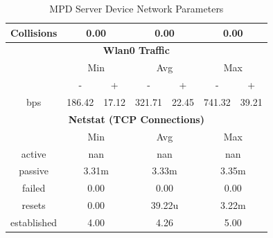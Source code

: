 \documentclass[11pt,a4paper]{scrreprt}
\begin{document}
\begin{table}[H]
\begin{tabular}{||c|c|c|c|c|c|c||}
    \hline
    Collisions & \multicolumn{2}{|c|}{0.00} & \multicolumn{2}{|c|}{0.00} & \multicolumn{2}{|c|}{0.00} \\
    \hline\hline
    \multicolumn{7}{|c|}{\textbf{Wlan0 Traffic}} \\
    \hline\hline
      & \multicolumn{2}{|c|}{Min} & \multicolumn{2}{|c|}{Avg} & \multicolumn{2}{|c|}{Max} \\
    \hline
      & - & + & - & + & - & + \\
    \hline
    bps  & 186.42 & 17.12 & 321.71 & 22.45 & 741.32 & 39.21 \\
    \hline\hline
    \multicolumn{7}{|c|}{\textbf{Netstat (TCP Connections)}} \\
    \hline\hline
      & \multicolumn{2}{|c|}{Min} & \multicolumn{2}{|c|}{Avg} & \multicolumn{2}{|c|}{Max} \\
    \hline
    active & \multicolumn{2}{|c|}{nan} & \multicolumn{2}{|c|}{nan} & \multicolumn{2}{|c|}{nan} \\
    \hline
    passive & \multicolumn{2}{|c|}{3.31m} & \multicolumn{2}{|c|}{3.33m} & \multicolumn{2}{|c|}{3.35m} \\
    \hline
    failed & \multicolumn{2}{|c|}{0.00} & \multicolumn{2}{|c|}{0.00} & \multicolumn{2}{|c|}{0.00} \\
    \hline
    resets & \multicolumn{2}{|c|}{0.00} & \multicolumn{2}{|c|}{39.22u} & \multicolumn{2}{|c|}{3.22m} \\
    \hline
    established & \multicolumn{2}{|c|}{4.00} & \multicolumn{2}{|c|}{4.26} & \multicolumn{2}{|c|}{5.00} \\
    \hline\hline
    \end{tabular}
    \caption{MPD Server Device Network Parameters}
    \label{MPDserverNetTab}
\end{table}
\end{document}
